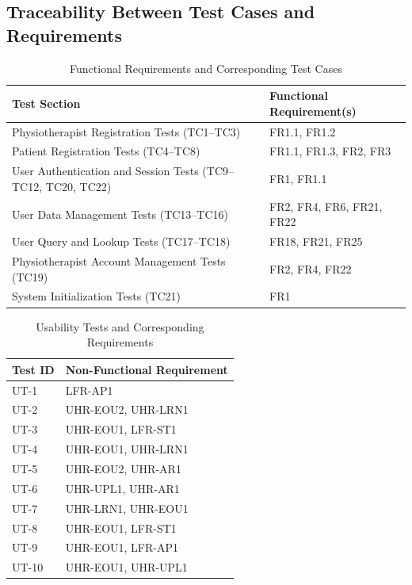 \documentclass[12pt, titlepage]{article}
\begin{document}
\subsection{Traceability Between Test Cases and Requirements}
\begin{table}[H]
  \centering
  \caption{ Functional Requirements and Corresponding Test Cases}
  \begin{tabular}{>{\raggedright\arraybackslash}p{} >{\raggedright\arraybackslash}p{}}
    \toprule \textbf{Test Section} & \textbf{Functional Requirement(s)} \\
    \midrule

    Physiotherapist Registration Tests (TC1--TC3) 
    & FR1.1, FR1.2 \\

    Patient Registration Tests (TC4--TC8) 
    & FR1.1, FR1.3, FR2, FR3 \\

    User Authentication and Session Tests (TC9--TC12, TC20, TC22) 
    & FR1, FR1.1 \\

    User Data Management Tests (TC13--TC16) 
    & FR2, FR4, FR6, FR21, FR22 \\

    User Query and Lookup Tests (TC17--TC18) 
    & FR18, FR21, FR25 \\

    Physiotherapist Account Management Tests (TC19) 
    & FR2, FR4, FR22 \\

    System Initialization Tests (TC21) 
    & FR1 \\

    \bottomrule
  \end{tabular}
\end{table}

\begin{table}[H]
  \centering
  \caption{Usability Tests and Corresponding Requirements}
  \label{tab:nfr-trace-us}
  \begin{tabular}{>{\raggedright\arraybackslash}p{} >{\raggedright\arraybackslash}p{}}
    \toprule
    \textbf{Test ID} & \textbf{Non-Functional Requirement} \\
    \midrule
    UT-1 & LFR-AP1 \\
    UT-2 & UHR-EOU2, UHR-LRN1 \\
    UT-3 & UHR-EOU1, LFR-ST1 \\
    UT-4 & UHR-EOU1, UHR-LRN1 \\
    UT-5 & UHR-EOU2, UHR-AR1 \\
    UT-6 & UHR-UPL1, UHR-AR1 \\
    UT-7 & UHR-LRN1, UHR-EOU1 \\
    UT-8 & UHR-EOU1, LFR-ST1 \\
    UT-9 & UHR-EOU1, LFR-AP1 \\
    UT-10 & UHR-EOU1, UHR-UPL1 \\
    \bottomrule
  \end{tabular}
\end{table}
\end{document}
